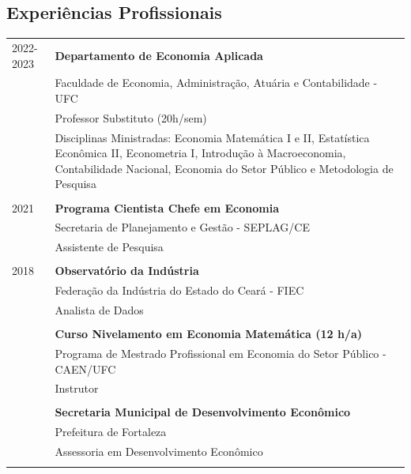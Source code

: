 \documentclass[a4paper,12pt]{article}
\begin{document}
	\subsection*{Experiências Profissionais}
	\setlength{\LTleft}{0pt}
	\begin{longtable}[t]{>{\raggedleft\arraybackslash}p{2.0cm}>{\raggedright\arraybackslash}p{13.5cm}}
		\textsc{2022-2023} & \textbf{Departamento de Economia Aplicada} \\
		& Faculdade de Economia, Administração, Atuária e Contabilidade - UFC \\
		& Professor Substituto (20h/sem) \\
		& Disciplinas Ministradas: Economia Matemática I e II, Estatística Econômica II, Econometria I, Introdução à Macroeconomia, Contabilidade Nacional, Economia do Setor Público e Metodologia de Pesquisa \\
		\multicolumn{2}{c}{\vspace{-0.2cm}} \\

		\textsc{2021} & \textbf{Programa Cientista Chefe em Economia} \\
		& Secretaria de Planejamento e Gestão - SEPLAG/CE \\
		& Assistente de Pesquisa \\
		\multicolumn{2}{c}{\vspace{-0.2cm}} \\

		\textsc{2018} & \textbf{Observatório da Indústria} \\
		& Federação da Indústria do Estado do Ceará - FIEC \\
		& Analista de Dados \\
		\multicolumn{2}{c}{\vspace{-0.2cm}} \\

		2017 & \textbf{Curso Nivelamento em Economia Matemática (12 h/a)} \\
		& Programa de Mestrado Profissional em Economia do Setor Público - CAEN/UFC \\
		& Instrutor \\
		\multicolumn{2}{c}{\vspace{-0.2cm}} \\

		2017 & \textbf{Secretaria Municipal de Desenvolvimento Econômico} \\
		& Prefeitura de Fortaleza \\
		& Assessoria em Desenvolvimento Econômico \\
		\multicolumn{2}{c}{\vspace{-0.2cm}} \\


\end{longtable}
\end{document}
